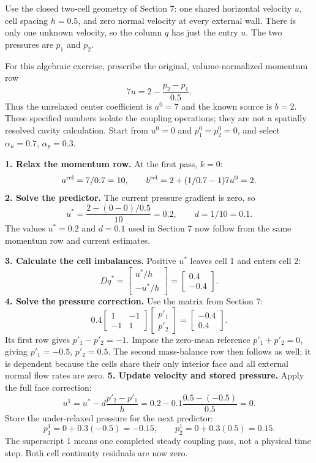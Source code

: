 \newpage
{}
Use the closed two-cell geometry of Section 7: one shared horizontal velocity
$u$, cell spacing $h=0.5$, and zero normal velocity at every external wall.
There is only one unknown velocity, so the column $q$ has just the entry $u$.
The two pressures are $p_1$ and $p_2$.

For this algebraic exercise, prescribe the original, volume-normalized momentum
row
\[
7u=2-\frac{p_2-p_1}{0.5}.
\]
Thus the unrelaxed center coefficient is $a^0=7$ and the known source is
$b=2$. These specified numbers isolate the coupling operations; they are not
a spatially resolved cavity calculation. Start from $u^0=0$ and
$p_1^0=p_2^0=0$, and select $\alpha_u=0.7$, $\alpha_p=0.3$.

\textbf{1. Relax the momentum row.} At the first pass, $k=0$:
\[
a^{\rm rel}=7/0.7=10,\qquad
b^{\rm rel}=2+(1/0.7-1)7u^0=2.
\]
\textbf{2. Solve the predictor.} The current pressure gradient is zero, so
\[
u^*=\frac{2-(0-0)/0.5}{10}=0.2,\qquad d=1/10=0.1.
\]
The values $u^*=0.2$ and $d=0.1$ used in Section 7 now follow from the same
momentum row and current estimates.

\textbf{3. Calculate the cell imbalances.} Positive $u^*$ leaves cell 1 and
enters cell 2:
\[
Dq^*=\begin{bmatrix}u^*/h\\-u^*/h\end{bmatrix}
=\begin{bmatrix}0.4\\-0.4\end{bmatrix}.
\]
\textbf{4. Solve the pressure correction.} Use the matrix from Section 7:
\[
0.4\begin{bmatrix}1&-1\\-1&1\end{bmatrix}
\begin{bmatrix}p'_1\\p'_2\end{bmatrix}
=\begin{bmatrix}-0.4\\0.4\end{bmatrix}.
\]
Its first row gives $p'_1-p'_2=-1$. Impose the zero-mean reference
$p'_1+p'_2=0$, giving $p'_1=-0.5$, $p'_2=0.5$. The second mass-balance row
then follows as well; it is dependent because the cells share their only
interior face and all external normal flow rates are zero.
\newpage
{}
\textbf{5. Update velocity and stored pressure.} Apply the full face correction:
\[
u^1=u^*-d\frac{p'_2-p'_1}{h}
=0.2-0.1\frac{0.5-(-0.5)}{0.5}=0.
\]
Store the under-relaxed pressure for the next predictor:
\[
p_1^1=0+0.3(-0.5)=-0.15,\qquad
p_2^1=0+0.3(0.5)=0.15.
\]
The superscript 1 means one completed steady coupling pass, not a physical
time step. Both cell continuity residuals are now zero.

